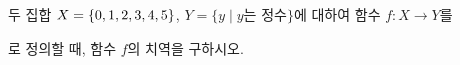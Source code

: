두 집합 $X=\{0{,}\mkern3mu\mathopen{}1{,}\mkern3mu\mathopen{}2{,}\mkern3mu\mathopen{}3{,}\mkern3mu\mathopen{}4{,}\mkern3mu\mathopen{}5\}$, $Y=\{y \mid y$는 정수$\}$에 대하여 함수 $f:X\longrightarrow Y$를 \par\smallskip{}\par\smallskip\noindent 로 정의할 때, 함수 $f$의 치역을 구하시오.
